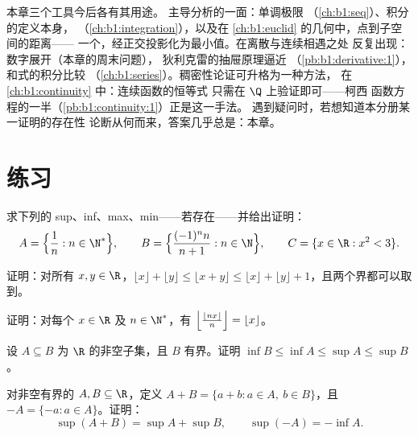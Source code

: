 \begin{remark}[本分册内的展望]
本章三个工具今后各有其用途。
主导分析的一面：单调极限
（\cref{ch:b1:seq}）、积分的定义本身，
（\cref{ch:b1:integration}），以及在
\cref{ch:b1:euclid} 的几何中，点到子空间的距离——
一个，经正交投影化为最小值。在离散与连续相遇之处
反复出现：数字展开（本章的周末问题），
狄利克雷的抽屉原理逼近
（\cref{pb:b1:derivative:1}），和式的积分比较
（\cref{ch:b1:series}）。稠密性论证可升格为一种方法，
在\cref{ch:b1:continuity} 中：连续函数的恒等式
只需在 $\Q$ 上验证即可——柯西
函数方程的一半（\cref{pb:b1:continuity:1}）正是这一手法。
遇到疑问时，若想知道本分册某一证明的存在性
论断从何而来，答案几乎总是：本章。
\end{remark}

\section{练习}

\begin{exercise}[$\star$]\label{exo:b1:reals:1}
求下列的 sup、inf、max、min——若存在——并给出证明：
\[
A = \Bigl\{\frac{1}{n} : n \in \N^*\Bigr\},
\qquad
B = \Bigl\{\frac{(-1)^n n}{n+1} : n \in \N\Bigr\},
\qquad
C = \{x \in \R : x^2 < 3\}.
\]
\end{exercise}

\begin{exercise}[$\star$]\label{exo:b1:reals:2}
证明：对所有 $x, y \in \R$，$\lfloor x \rfloor + \lfloor y
\rfloor \leq \lfloor x + y \rfloor \leq \lfloor x \rfloor + \lfloor y
\rfloor + 1$，且两个界都可以取到。
\end{exercise}

\begin{exercise}[$\star$]\label{exo:b1:reals:3}
证明：对每个 $x \in \R$ 及 $n \in \N^*$，有
$\Bigl\lfloor \frac{\lfloor nx \rfloor}{n} \Bigr\rfloor = \lfloor x
\rfloor$。
\end{exercise}

\begin{exercise}[$\star$]\label{exo:b1:reals:4}
设 $A \subseteq B$ 为 $\R$ 的非空子集，且 $B$ 有界。证明
$\inf B \leq \inf A \leq \sup A \leq \sup B$。
\end{exercise}

\begin{exercise}[$\star\star$]\label{exo:b1:reals:5}
对非空有界的 $A, B \subseteq \R$，定义 $A + B = \{a + b : a
\in A,\ b \in B\}$，且 $-A = \{-a : a \in A\}$。证明：
\[
\sup(A + B) = \sup A + \sup B,
\qquad
\sup(-A) = -\inf A .
\]
\end{exercise}


